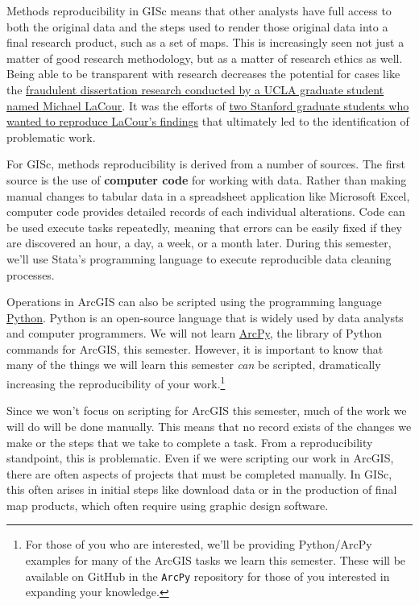 \documentclass[]{book}
\let\rmarkdownfootnote\footnote%
\def\footnote{\protect\rmarkdownfootnote}
\begin{document}
Methods reproducibility in GISc means that other analysts have full
access to both the original data and the steps used to render those
original data into a final research product, such as a set of maps. This
is increasingly seen not just a matter of good research methodology, but
as a matter of research ethics as well. Being able to be transparent
with research decreases the potential for cases like the
\href{http://nymag.com/scienceofus/2015/05/how-a-grad-student-uncovered-a-huge-fraud.html}{fraudulent
dissertation research conducted by a UCLA graduate student named Michael
LaCour}. It was the efforts of
\href{https://fivethirtyeight.com/features/how-two-grad-students-uncovered-michael-lacour-fraud-and-a-way-to-change-opinions-on-transgender-rights/}{two
Stanford graduate students who wanted to reproduce LaCour's findings}
that ultimately led to the identification of problematic work.

For GISc, methods reproducibility is derived from a number of sources.
The first source is the use of \textbf{computer code} for working with
data. Rather than making manual changes to tabular data in a spreadsheet
application like Microsoft Excel, computer code provides detailed
records of each individual alterations. Code can be used execute tasks
repeatedly, meaning that errors can be easily fixed if they are
discovered an hour, a day, a week, or a month later. During this
semester, we'll use Stata's programming language to execute reproducible
data cleaning processes.

Operations in ArcGIS can also be scripted using the programming language
\href{https://www.python.org}{Python}. Python is an open-source language
that is widely used by data analysts and computer programmers. We will
not learn
\href{http://pro.arcgis.com/en/pro-app/arcpy/get-started/what-is-arcpy-.htm}{ArcPy},
the library of Python commands for ArcGIS, this semester. However, it is
important to know that many of the things we will learn this semester
\emph{can} be scripted, dramatically increasing the reproducibility of
your work.\footnote{For those of you who are interested, we'll be
  providing Python/ArcPy examples for many of the ArcGIS tasks we learn
  this semester. These will be available on GitHub in the \texttt{ArcPy}
  repository for those of you interested in expanding your knowledge.}

Since we won't focus on scripting for ArcGIS this semester, much of the
work we will do will be done manually. This means that no record exists
of the changes we make or the steps that we take to complete a task.
From a reproducibility standpoint, this is problematic. Even if we were
scripting our work in ArcGIS, there are often aspects of projects that
must be completed manually. In GISc, this often arises in initial steps
like download data or in the production of final map products, which
often require using graphic design software.
\end{document}
